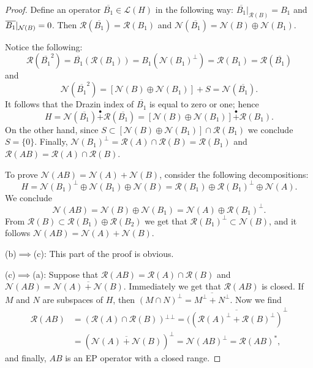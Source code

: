 \documentclass{proc-l}
\theoremstyle{plain}
\theoremstyle{remark}
\theoremstyle{definition}
\newcommand{\myL}{\mathcal{L}}
\newcommand{\R}{\mathcal{R}}
\newcommand{\N}{\mathcal{N}}
\newcommand{\ov}[1]{\overline {#1}}
\begin{document}
\begin{proof}
Define an operator $\ov {B_{1}}\in \myL (H)$ in the following way:
$\ov {B_{1}}|_{\R (B)}=B_{1}$ and $\ov {B_{1}}|_{\N (B)}\linebreak
=0$. Then
$\R (\ov {B_{1}})=\R (B_{1})$ and $\N (\ov {B_{1}})=\N (B)\oplus \N 
(B_{1})$.

Notice the following:
\begin{equation*}\R (\ov {B_{1}}^{2})=\ov {B_{1}}(\R (B_{1}))=B_{1}(\N 
(B_{1})^{\bot })=\R (B_{1})=
\R (\ov {B_{1}})\end{equation*}
and
\begin{equation*}\N (\ov {B_{1}}^{2})=[\N (B)\oplus \N (B_{1})]+S=\N 
(\ov {B_{1}}).\end{equation*}
It follows that the Drazin index of $\ov {B_{1}}$ is equal to
zero or one; hence
\begin{equation*}H=\N (\ov {B_{1}})\overset{\bullet}{+} \R (\ov {B_{1}})=[\N 
(B)\oplus \N (B_{1})]\overset{\bullet}{+} \R (B_{1}).\end{equation*}
On the other hand, since $S\subset[\N (B)\oplus \N (B_{1})]\cap \R (B_{1})$
we conclude
$S=\{0\}$. Finally, $\N (B_{1})^{\bot }=\R (A)\cap \R (B)=\R (B_{1})$ and
$\R (AB)=\R (A)\cap \R (B)$.

To prove $\N (AB)=\N (A)+\N (B)$, consider the following decompositions:
\begin{equation*}H=\N (B_{1})^{\bot }\oplus \N (B_{1})\oplus \N (B)=\R 
(B_{1})\oplus \R (B_{1})^{\bot }\oplus \N (A).\tag{2}\end{equation*}
We conclude
\begin{equation*}\N (AB)=\N (B)\oplus \N (B_{1})=\N (A)\oplus \R 
(B_{1})^{\bot }.\end{equation*}
From $\R (B)\subset\R (B_{1})\oplus \R (B_{2})$ we get
that $\R (B_{1})^{\bot 
}\subset\N (B)$, and
 it follows  $\N (AB)=\N (A)+\N (B)$.

(b)$\implies $(c): This part of the proof is obvious.

(c)$\implies $(a): Suppose that $\R (AB)=\R (A)\cap \R (B)$ and
$\N (AB)=\overline{\N (A)+\N (B)}$. Immediately we get that $\R (AB)$ is 
closed.
If $M$ and $N$ are subspaces of $H$, then\linebreak
$(M\cap N)^{\bot 
}=\overline{M^{\bot }+N^{\bot }}$.
Now we find
\begin{equation*}\begin{split}
\R (AB)&=(\R (A)\cap \R (B)){^{\bot }}{^{\bot }}=(\overline{(\R 
(A)^{\bot }+\R (B)^{\bot })}^{\bot }\\
&= (\overline{\N (A)+\N (B)})^{\bot }=\N (AB)^{\bot }=\R (AB)^{*},
\end{split}\end{equation*}
and finally,  $AB$ is an EP operator with a closed range.\end{proof}
\end{document}
